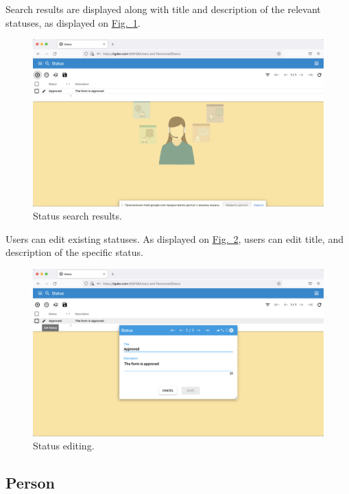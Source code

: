 \newpage
Search results are displayed along with title and description of the relevant statuses, as displayed on 
\hyperref[sections/personnel/images/18]{Fig.~\ref*{sections/personnel/images/18}}.

\begin{figure}[!htbp]
\centering
\includegraphics[width=0.95\linewidth]{sections/personnel/images/18.png}
\caption{Status search results.}\label{sections/personnel/images/18}
\end{figure}

\newpage
Users can edit existing statuses. As displayed on \hyperref[sections/personnel/images/19]{Fig.~\ref*{sections/personnel/images/19}}, users can edit title, and description of the specific status.

\begin{figure}[!htbp]
\centering
\includegraphics[width=0.95\linewidth]{sections/personnel/images/19.png}
\caption{Status editing.}\label{sections/personnel/images/19}
\end{figure}

\newpage
\subsection{Person}

